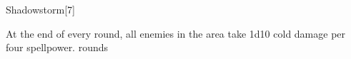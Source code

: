 \begin{spellsection}{Shadowstorm}[7]
    \begin{spellheader}
    \end{spellheader}
    \begin{spellcontent}
        \begin{spelltargetinginfo}
        \end{spelltargetinginfo}
        \begin{spelleffects}
            \spelleffect At the end of every round, all enemies in the area take 1d10 cold damage per four spellpower.
             rounds
        \end{spelleffects}
    \end{spellcontent}
    \begin{spellfooter}
        \miscastexplode
    \end{spellfooter}
\end{spellsection}

